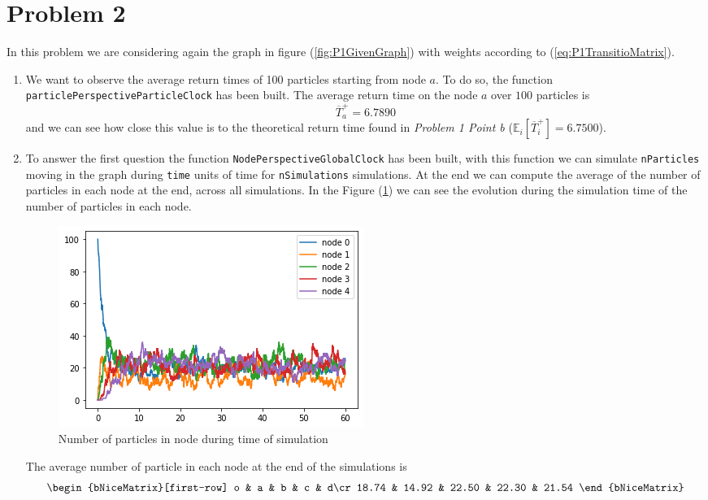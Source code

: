 \documentclass[
	12pt, %
]{fphw}
\begin{document}
\section*{Problem 2}
In this problem we are considering again the graph in figure (\ref{fig:P1GivenGraph}) with weights according to (\ref{eq:P1TransitioMatrix}).
\begin{enumerate}[(a\normalfont)]
    \item We want to observe the average return times of 100 particles starting from node $a$. To do so, the function \texttt{particlePerspectiveParticleClock} has been built. The average return time on the node $a$ over $100$ particles is 
    $$ \overline{T}_a^+ = 6.7890$$
    and we can see how close this value is to the theoretical return time found in \emph{Problem 1 Point b} ($\mathds{E}_i[\overline{T}_{i}^{+}] = 6.7500$).
    \item To answer the first question the function \texttt{NodePerspectiveGlobalClock} has been built, with this function we can simulate \texttt{nParticles} moving in the graph during \texttt{time} units of time for \texttt{nSimulations} simulations. 
    At the end we can compute the average of the number of particles in each node at the end, across all simulations. 
    In the Figure (\ref{fig:P2b}) we can see the evolution during the simulation time of the number of particles in each node. 
    \begin{figure}[H]
        \centering
    	\includegraphics[width=0.8\columnwidth]{P2b.png} 
    	\caption{Number of particles in node during time of simulation}
    	\label{fig:P2b}
    \end{figure}
    
    The average number of particle in each node at the end of the simulations is
    $$
    \begin{bNiceMatrix}[first-row]
        o & a & b & c & d\cr
        18.74 & 14.92 & 22.50 & 22.30 & 21.54
    \end{bNiceMatrix}
    $$
    

\end{enumerate}
\end{document}
